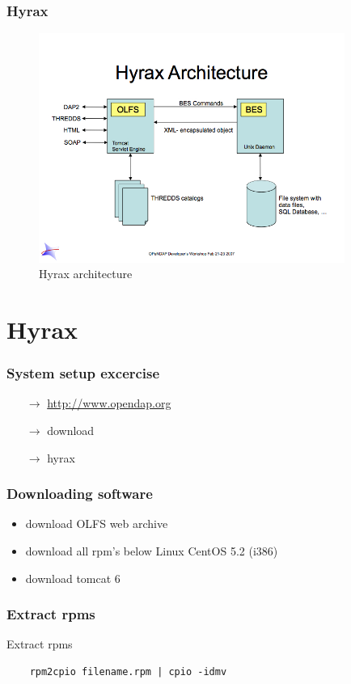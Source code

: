 \documentclass[]{beamer}
\begin{document}
\frame
{
  \frametitle{Hyrax}
  \begin{figure}[htbp]
   \centering
   \includegraphics[width=10cm]{HyraxArchitecture.jpg} %
   \caption{Hyrax architecture}
   \label{fig:processes}
\end{figure}
}



\section{Hyrax}
\frame
{
  \frametitle{System setup excercise}
  \begin{itemize}
  \item[$\rightarrow$] \url{http://www.opendap.org}
  \item[$\rightarrow$] download
  \item[$\rightarrow$] hyrax
  \end{itemize}
}

\frame
{
  \frametitle{Downloading software}
  \begin{itemize}
  \item download OLFS web archive
  \item download all rpm's below Linux CentOS 5.2 (i386)
  \item download tomcat 6
  \end{itemize}
}

\begin{frame}[fragile]
  \frametitle{Extract rpms}
\begin{block}{Extract rpms}
  \lstset{language=bash}
  \begin{lstlisting}
    rpm2cpio filename.rpm | cpio -idmv
\end{lstlisting}
\end{block}
\end{frame}
\end{document}
